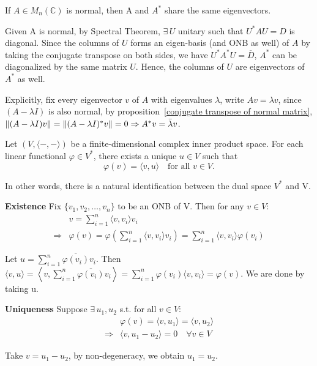 \begin{proposition}
If $A\in M_{n}(\mathbb{C})$ is normal, then A and $A^{*}$ share the same eigenvectors.
\end{proposition}

\begin{pfbox}
Given A is normal, by Spectral Theorem, $\exists\, U$ unitary such that $U^{*}AU = D$ is diagonal.
Since the columns of $U$ forms an eigen-basis (and ONB as well) of $A$
by taking the conjugate transpose on both sides, we have $U^{*}A^{*}U = \overline{D}$,
$A^{*}$ can be diagonalized by the same matrix $U$. 
Hence, the columns of $U$ are eigenvectors of $A^{*}$ as well.

Explicitly,  fix every eigenvector $v$ of $A$ with eigenvalues $\lambda$, write
$Av = \lambda v$, since $(A-\lambda I)$ is also normal, by proposition~\eqref{conjugate transpose of normal matrix}, $\left\lVert (A-\lambda I)v \right\rVert = \left\lVert (A-\lambda I)^*v \right\rVert = 0 \Rightarrow A^*v = \bar{\lambda}v$.
\end{pfbox}



\begin{theorem}
Let $(V,\langle-,-\rangle)$ be a finite-dimensional complex inner product space. For each linear functional $\varphi\in V^{*}$, there exists a unique $u\in V$ such that
\[
\varphi(v)=\langle v,u\rangle \quad \text{for all } v\in V.
\]
\end{theorem}

\begin{remark}
In other words, there is a natural identification between the dual space $V^{*}$ and V.
\end{remark}

\begin{pfbox}
\textbf{Existence} Fix $\{v_1, v_2, \dots, v_n\}$ to be an ONB of V.
Then for any $v \in V$:
\begin{align*}
&v = \sum_{i=1}^{n}\langle v,v_i\rangle v_i\\\Rightarrow 
&\varphi(v) = \varphi\left(\sum_{i=1}^{n}\langle v,v_i\rangle v_i\right) = \sum_{i=1}^{n}\langle v,v_i\rangle \varphi(v_i)
\end{align*}

Let $u = \sum_{i=1}^{n}\overline{\varphi(v_i)}v_i$.
Then $\langle v, u \rangle = \left\langle v, \sum_{i=1}^{n}\overline{\varphi(v_i)}v_i \right\rangle = \sum_{i=1}^{n} \varphi(v_i)\langle v, v_i \rangle = \varphi(v)$.
We are done by taking u.

\textbf{Uniqueness} Suppose $\exists\, u_1, u_2$ s.t. for all $v \in V$:
\begin{align*}
&\varphi(v) = \langle v, u_1 \rangle = \langle v, u_2 \rangle\\ \Rightarrow
&\langle v, u_1 - u_2 \rangle = 0 \quad \forall v \in V  
\end{align*}

Take $v = u_1 - u_2$, by non-degeneracy, we obtain $u_1 = u_2$.
\end{pfbox}
